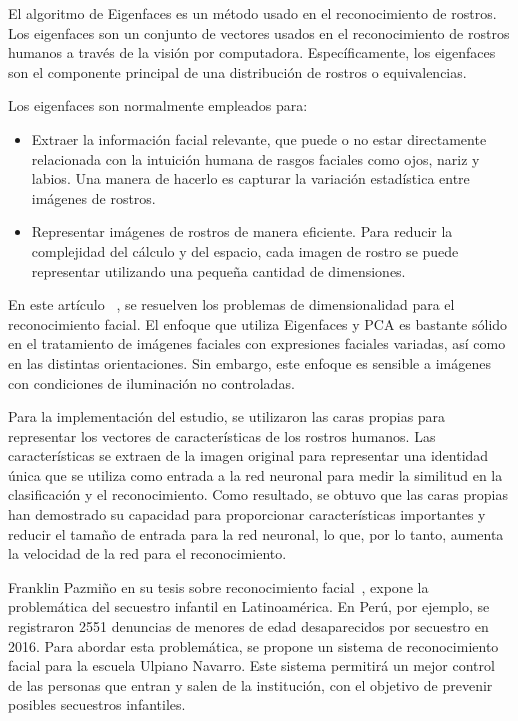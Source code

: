 El algoritmo de Eigenfaces es un método usado en el reconocimiento de rostros. Los eigenfaces son un conjunto de vectores usados en el reconocimiento de rostros humanos a través de la visión por computadora. Específicamente, los eigenfaces son el componente principal de una distribución de rostros o equivalencias.

Los eigenfaces son normalmente empleados para:

\begin{itemize}
	\item Extraer la información facial relevante, que puede o no estar directamente relacionada con la intuición humana de rasgos faciales como ojos, nariz y labios. Una manera de hacerlo es capturar la variación estadística entre imágenes de rostros.
	\item Representar imágenes de rostros de manera eficiente. Para reducir la complejidad del cálculo y del espacio, cada imagen de rostro se puede representar utilizando una pequeña cantidad de dimensiones.
\end{itemize}

En este artículo ~\cite{tesis}, se resuelven los problemas de dimensionalidad para el reconocimiento facial. El enfoque que utiliza Eigenfaces y PCA es bastante sólido en el tratamiento de imágenes faciales con expresiones faciales variadas, así como en las distintas orientaciones. Sin embargo, este enfoque es sensible a imágenes con condiciones de iluminación no controladas.

Para la implementación del estudio, se utilizaron las caras propias para representar los vectores de características de los rostros humanos. Las características se extraen de la imagen original para representar una identidad única que se utiliza como entrada a la red neuronal para medir la similitud en la clasificación y el reconocimiento. Como resultado, se obtuvo que las caras propias han demostrado su capacidad para proporcionar características importantes y reducir el tamaño de entrada para la red neuronal, lo que, por lo tanto, aumenta la velocidad de la red para el reconocimiento.

Franklin Pazmiño en su tesis sobre reconocimiento facial~\cite{PUCE}, expone la problemática del secuestro infantil en Latinoamérica. 
En Perú, por ejemplo, se registraron 2551 denuncias de menores de edad desaparecidos por secuestro en 2016.
Para abordar esta problemática, se propone un sistema de reconocimiento facial para la escuela Ulpiano Navarro. Este sistema permitirá un mejor control de las personas que entran y salen de la institución, con el objetivo de prevenir posibles secuestros infantiles. 


